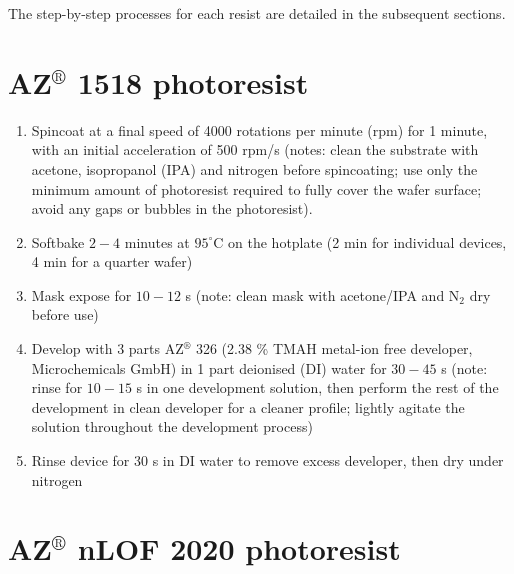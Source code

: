\documentclass[
  a4paper,
]{scrbook}
\begin{document}
The step-by-step processes for each resist are detailed in the
subsequent sections.

\hypertarget{azcircledr-1518-photoresist}{%
\section{\texorpdfstring{AZ\(^\circledR\) 1518
photoresist}{AZ\^{}\textbackslash circledR 1518 photoresist}}\label{azcircledr-1518-photoresist}}

\begin{enumerate}
\def\labelenumi{\arabic{enumi}.}
\item
  Spincoat at a final speed of 4000 rotations per minute (rpm) for 1
  minute, with an initial acceleration of 500 rpm/s (notes: clean the
  substrate with acetone, isopropanol (IPA) and nitrogen before
  spincoating; use only the minimum amount of photoresist required to
  fully cover the wafer surface; avoid any gaps or bubbles in the
  photoresist).
\item
  Softbake \(2-4\) minutes at \(95^\circ\)C on the hotplate (2 min for
  individual devices, 4 min for a quarter wafer)
\item
  Mask expose for \(10-12\) s (note: clean mask with acetone/IPA and
  N\(_2\) dry before use)
\item
  Develop with 3 parts AZ\(^\circledR\) 326 (2.38 \% TMAH metal-ion free
  developer, Microchemicals GmbH) in 1 part deionised (DI) water for
  \(30-45\) s (note: rinse for \(10-15\) s in one development solution,
  then perform the rest of the development in clean developer for a
  cleaner profile; lightly agitate the solution throughout the
  development process)
\item
  Rinse device for 30 s in DI water to remove excess developer, then dry
  under nitrogen
\end{enumerate}

\hypertarget{azcircledr-nlof-2020-photoresist}{%
\section{\texorpdfstring{AZ\(^\circledR\) nLOF 2020
photoresist}{AZ\^{}\textbackslash circledR nLOF 2020 photoresist}}\label{azcircledr-nlof-2020-photoresist}}
\end{document}
